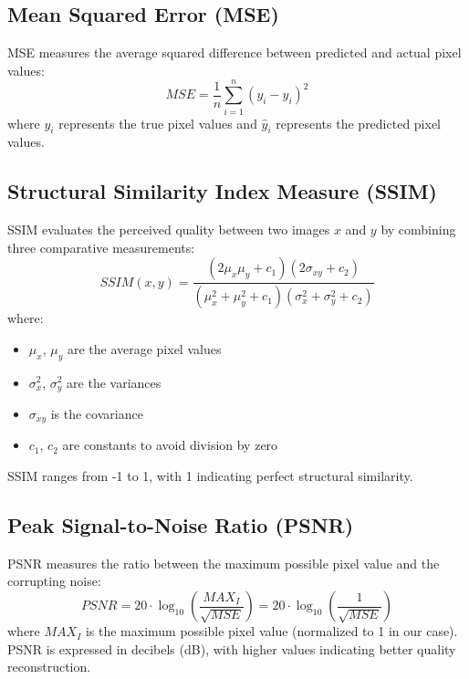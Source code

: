 \documentclass{article}
\begin{document}
        \subsection{Mean Squared Error (MSE)}
        MSE measures the average squared difference between predicted and actual pixel values:
            \begin{equation}
                MSE = \frac{1}{n} \sum_{i=1}^{n} (y_i - \hat{y}_i)^2
            \end{equation}
        where $y_i$ represents the true pixel values and $\hat{y}_i$ represents the predicted pixel values.
    
        \subsection{Structural Similarity Index Measure (SSIM)}
        SSIM evaluates the perceived quality between two images $x$ and $y$ by combining three comparative measurements:
        \begin{equation}
            SSIM(x,y) = \frac{(2\mu_x\mu_y + c_1)(2\sigma_{xy} + c_2)}{(\mu_x^2 + \mu_y^2 + c_1)(\sigma_x^2 + \sigma_y^2 + c_2)}
        \end{equation}
        where:
        \begin{itemize}
            \item $\mu_x$, $\mu_y$ are the average pixel values
            \item $\sigma_x^2$, $\sigma_y^2$ are the variances
            \item $\sigma_{xy}$ is the covariance
            \item $c_1$, $c_2$ are constants to avoid division by zero
        \end{itemize}
        SSIM ranges from -1 to 1, with 1 indicating perfect structural similarity.
    
        \subsection{Peak Signal-to-Noise Ratio (PSNR)}
        PSNR measures the ratio between the maximum possible pixel value and the corrupting noise:
        \begin{equation}
            PSNR = 20 \cdot \log_{10}\left(\frac{MAX_I}{\sqrt{MSE}}\right) = 20 \cdot \log_{10}\left(\frac{1}{\sqrt{MSE}}\right)
        \end{equation}
        where $MAX_I$ is the maximum possible pixel value (normalized to 1 in our case). PSNR is expressed in decibels (dB), with higher values indicating better quality reconstruction.
    
\end{document}
